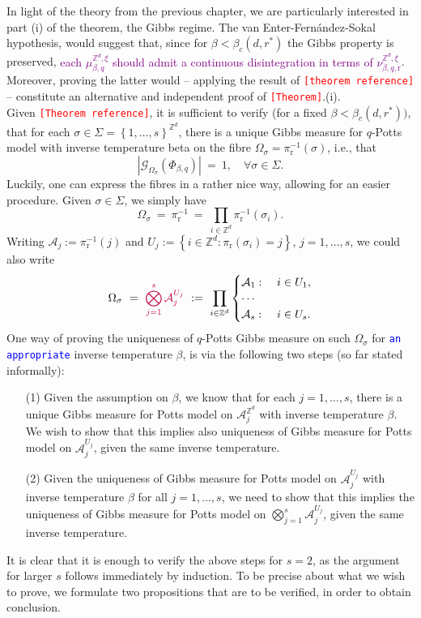 \documentclass[12pt]{article}
\newcommand{\A}{\mathcal{A}}
\newcommand{\G}{\mathcal{G}}
\renewcommand{\r}{\mathrm{r}}
\newcommand{\Z}{\mathbb{Z}}
\newcommand{\set}[1]{\left\{#1\right\}}
\newcommand{\1}{\mathbbm{1}}
\newcommand{\5}{\vspace{0.5cm}}
\theoremstyle{definition}
\begin{document}
In light of the theory from the previous chapter, we are particularly interested in part (i) of the theorem, the Gibbs regime. The van Enter-Fern\'andez-Sokal hypothesis, would suggest that, since for $\beta<\beta_c(d,r^*)$ the Gibbs property is preserved, \textcolor{purple}{each $\mu_{\beta,q}^{\Z^d,\xi}$ should admit a continuous disintegration in terms of $\nu_{\beta,q,\r}^{\Z^d,\xi}$}. Moreover, proving the latter would -- applying the result of \textcolor{red}{\texttt{[theorem reference]}} -- constitute an alternative and independent proof of \textcolor{red}{\texttt{[Theorem]}}.(i). \\

Given \textcolor{red}{\texttt{[Theorem reference]}}, it is sufficient to verify (for a fixed $\beta<\beta_c(d,r^*))$, that for each $\sigma\in\Sigma=\set{1,\ldots,s}^{\Z^d}$, there is a unique Gibbs measure for $q$-Potts model with inverse temperature beta on the fibre $\Omega_\sigma=\pi_\r^{-1}(\sigma)$, i.e., that
$$|\G_{\Omega_\sigma}(\Phi_{\beta,q})| ~=~ 1, \quad \forall \sigma\in\Sigma.$$
Luckily, one can express the fibres in a rather nice way, allowing for an easier procedure. Given $\sigma\in\Sigma$, we simply have
$$\Omega_\sigma ~=~ \pi_{\r}^{-1} ~=~ \prod_{i\in\Z^d}\pi_{\r}^{-1}(\sigma_i).$$
Writing $\A_j:=\pi_{\r}^{-1}(j)$ and $U_j:=\set{i\in\Z^d:\pi_{\r}(\sigma_i)=j}$, $j=1,\ldots,s$, we could also write
$$\Omega_\sigma ~=~ \textcolor{purple}{\bigotimes_{j=1}^s\A_j^{U_j}} ~:=~ \prod_{i\in\Z^d}\begin{cases}\A_1:~&i\in U_1,\\
\cdots\\
\A_s:~&i\in U_s.\end{cases}$$
One way of proving the uniqueness of $q$-Potts Gibbs measure on such $\Omega_\sigma$ for \textcolor{blue}{\texttt{an appropriate}} inverse temperature $\beta$, is via the following two steps (so far stated informally):
\begin{itemize}
	\item[(1)] Given the assumption on $\beta$, we know that for each $j=1,\ldots,s$, there is a unique Gibbs measure for Potts model on $\A_j^{\Z^d}$ with inverse temperature $\beta$. We wish to show that this implies also uniqueness of Gibbs measure for Potts model on $\A_j^{U_j}$, given the same inverse temperature.
	\item[(2)] Given the uniqueness of Gibbs measure for Potts model on $\A_j^{U_j}$ with inverse temperature $\beta$ for all $j=1,\ldots,s$, we need to show that this implies the uniqueness of Gibbs measure for Potts model on $\bigotimes_{j=1}^s \A_j^{U_j}$, given the same inverse temperature.
\end{itemize}
It is clear that it is enough to verify the above steps for $s=2$, as the argument for larger $s$ follows immediately by induction. To be precise about what we wish to prove, we formulate two propositions that are to be verified, in order to obtain conclusion.
\end{document}
